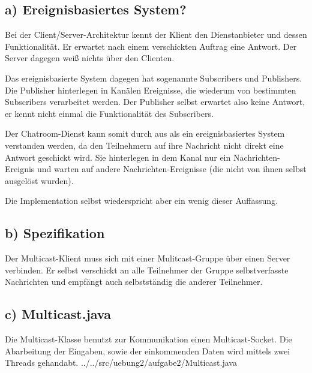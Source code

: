 \subsection*{a) Ereignisbasiertes System?}
	Bei der Client/Server-Architektur kennt der Klient den Dienstanbieter und dessen Funktionalität.
	Er erwartet nach einem verschickten Auftrag eine Antwort. 
	Der Server dagegen weiß nichts über den Clienten.

	Das ereignisbasierte System dagegen hat sogenannte Subscribers und Publishers.
	Die Publisher hinterlegen in Kanälen Ereignisse, die wiederum von bestimmten Subscribers verarbeitet werden. 
	Der Publisher selbst erwartet also keine Antwort, er kennt nicht einmal die Funktionalität des Subscribers.

	Der Chatroom-Dienst kann somit durch aus als ein ereignisbasiertes System verstanden werden, da den Teilnehmern auf ihre Nachricht nicht direkt eine Antwort geschickt wird. Sie hinterlegen in dem Kanal nur ein Nachrichten-Ereignis und warten auf andere Nachrichten-Ereignisse (die nicht von ihnen selbst ausgelöst wurden).

	Die Implementation selbst wiederspricht aber ein wenig dieser Auffassung.

\subsection*{b) Spezifikation}
	Der Multicast-Klient muss sich mit einer Mulitcast-Gruppe über einen Server verbinden.
	Er selbst verschickt an alle Teilnehmer der Gruppe selbstverfasste Nachrichten und empfängt auch selbstständig die anderer Teilnehmer.

\subsection*{c) Multicast.java}
	Die Multicast-Klasse benutzt zur Kommunikation einen Multicast-Socket.
	Die Abarbeitung der Eingaben, sowie der einkommenden Daten wird mittels zwei Threads gehandabt.
	 {../../src/uebung2/aufgabe2/Multicast.java}
